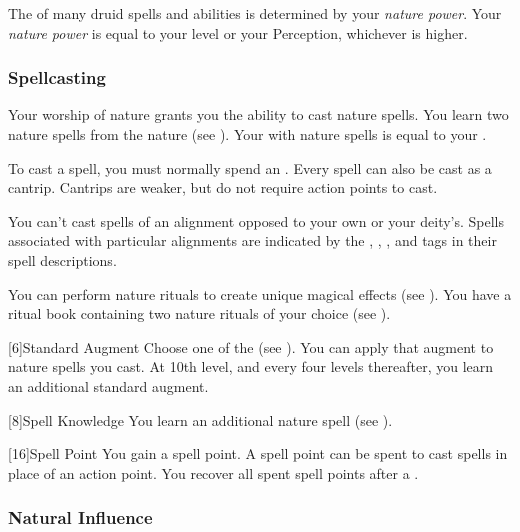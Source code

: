         The  of many druid spells and abilities is determined by your \textit{nature power}.
        Your \textit{nature power} is equal to your level or your Perception, whichever is higher.

        \subsubsection{Spellcasting}

            Your worship of nature grants you the ability to cast nature spells.
            You learn two nature spells from the nature  (see ).
            Your  with nature spells is equal to your .

            To cast a spell, you must normally spend an .
            Every spell can also be cast as a cantrip.
            Cantrips are weaker, but do not require action points to cast.

            You can't cast spells of an alignment opposed to your own or your deity's.
            Spells associated with particular alignments are indicated by the , , , and  tags in their spell descriptions.

            You can perform nature rituals to create unique magical effects (see ).
            You have a ritual book containing two nature rituals of your choice (see ).

            [6]{Standard Augment}
            Choose one of the  (see ).
            You can apply that augment to nature spells you cast.
            At 10th level, and every four levels thereafter, you learn an additional standard augment.

            [8]{Spell Knowledge}
            You learn an additional nature spell (see ).

            [16]{Spell Point} 
            You gain a spell point.
            A spell point can be spent to cast spells in place of an action point.
            You recover all spent spell points after a .

        \subsubsection{Natural Influence}

